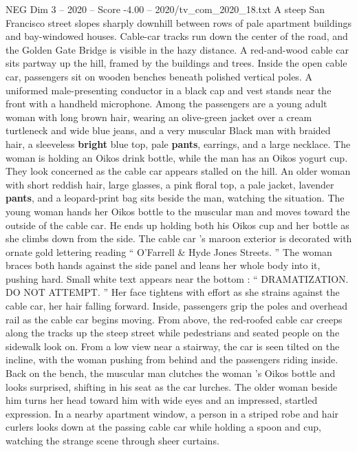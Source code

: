 \begin{textsample}{NEG Dim 3 – 2020 – Score -4.00 – 2020/tv\_com\_2020\_18.txt}  \label{ex:f3_neg_026}
A steep San Francisco street slopes sharply downhill between rows of pale apartment buildings and bay-windowed houses.
Cable-car tracks run down the center of the road, and the Golden Gate Bridge is visible in the hazy distance.
A red-and-wood cable car sits partway up the hill, framed by the buildings and trees.
Inside the open cable car, passengers sit on wooden benches beneath polished vertical poles.
A uniformed male-presenting conductor in a black cap and vest stands near the front with a handheld microphone.
Among the passengers are a young adult woman with long brown hair, wearing an olive-green jacket over a cream turtleneck and wide blue jeans, and a very muscular Black man with braided hair, a sleeveless \textbf{bright} blue top, pale \textbf{pants}, earrings, and a large necklace.
The woman is holding an Oikos drink bottle, while the man has an Oikos yogurt cup.
They look concerned as the cable car appears stalled on the hill.
An older woman with short reddish hair, large glasses, a pink floral top, a pale jacket, lavender \textbf{pants}, and a leopard-print bag sits beside the man, watching the situation.
The young woman hands her Oikos bottle to the muscular man and moves toward the outside of the cable car.
He ends up holding both his Oikos cup and her bottle as she climbs down from the side.
The cable car ’s maroon exterior is decorated with ornate gold lettering reading “ O’Farrell \& Hyde Jones Streets. ” The woman braces both hands against the side panel and leans her whole body into it, pushing hard.
Small white text appears near the bottom : “ DRAMATIZATION.
DO NOT ATTEMPT. ” Her face tightens with effort as she strains against the cable car, her hair falling forward.
Inside, passengers grip the poles and overhead rail as the cable car begins moving.
From above, the red-roofed cable car creeps along the tracks up the steep street while pedestrians and seated people on the sidewalk look on.
From a low view near a stairway, the car is seen tilted on the incline, with the woman pushing from behind and the passengers riding inside.
Back on the bench, the muscular man clutches the woman ’s Oikos bottle and looks surprised, shifting in his seat as the car lurches.
The older woman beside him turns her head toward him with wide eyes and an impressed, startled expression.
In a nearby apartment window, a person in a striped robe and hair curlers looks down at the passing cable car while holding a spoon and cup, watching the strange scene through sheer curtains.

\end{textsample}
